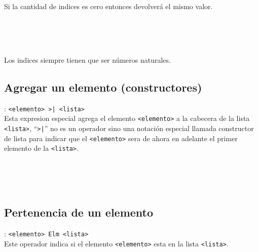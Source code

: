       \begin{fxcode}
         \\
      \end{fxcode}
      
      Si la cantidad de indices es cero entonces devolverá el mismo valor.
      
      \begin{fxcode}
         \arrowcode{[[1, 2, 3], [4, 5, 6], [7, 8, 9]]\{\}}\\
         \outcode{[[1, 2, 3], [4, 5, 6], [7, 8, 9]]}\\
         \\
      \end{fxcode}
      
      Los indices siempre tienen que ser números naturales.
      
      \subsection*{Agregar un elemento (constructores)}: \texttt{<elemento>~\texttt{>|} <lista>}\\
      Esta expresion especial agrega el elemento \texttt{<elemento>} a la cabecera de la lista \texttt{<lista>}, ``\texttt{>|}'' no es un operador sino una notación especial llamada constructor de lista para indicar que el \texttt{<elemento>} sera de ahora en adelante el primer elemento de la \texttt{<lista>}.
      
      \begin{fxcode}
         \\
         \outcode{[3, 1, 2]}\\
         \\
         \outcode{[true]}
      \end{fxcode}
      
      \subsection*{Pertenencia de un elemento}: \texttt{<elemento>~Elm <lista>}\\
      Este operador indica si el elemento \texttt{<elemento>} esta en la lista \texttt{<lista>}.
      
      \begin{fxcode}
         \\
         \\
         \\
         \outcode{[false]}
      \end{fxcode}
      
